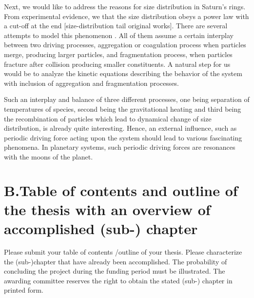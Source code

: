 \documentclass[11pt, notitlepage]{article} %
\begin{document}
Next, we would like to address the reasons for size distribution in Saturn's rings. 
From experimental evidence, we that the size distribution obeys a power
law with a cut-off at the end [size-distribution tail original works]. There are several attempts
to model this phenomenon \cite{Brilliantov2013,spahn2014}. All of them assume a certain interplay between
two driving processes, aggregation or coagulation process when particles merge, producing 
larger particles, and fragmentation process, when particles
fracture after collision producing smaller constituents. A natural step for us would be 
to analyze the kinetic equations describing the behavior of the system with inclusion 
of aggregation and fragmentation processes.

Such an interplay and balance of three different processes, one being separation of 
temperatures of species, second being the gravitational heating and third 
being the recombination of particles which lead to dynamical change of size distribution,
is already quite interesting. Hence, an external influence, such as periodic 
driving force acting upon the system should lead to various fascinating phenomena.
In planetary systems, such periodic driving forces are resonances with the moons of the 
planet.


\spa
\section*{B.Table of contents and outline of the thesis with an overview of accomplished (sub-) chapter}
Please submit your table of contents /outline of your thesis. Please characterize the (sub-)chapter that have already been accomplished. 
The probability of concluding the project during the funding period  must  be  illustrated.  The awarding committee reserves the right to obtain the stated (sub-) chapter in printed form.


\newpage
\end{document}
